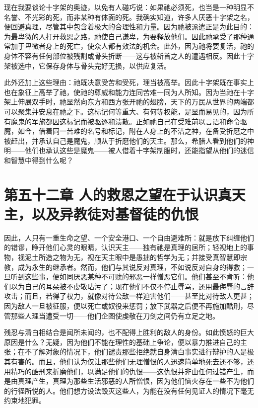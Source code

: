 现在我要谈论十字架的奥迹，以免有人碰巧说：如果祂必须死，也当是一种明显不名誉、不光彩的死，而非某种有体面的死。我确实知道，许多人厌恶十字架之名，便回避真理，尽管其中包含着极大的合理性和力量。因为祂被派遣正是为此目的：为最卑微的人打开救恩之路，祂使自己谦卑，为要释放他们。因此祂承受了那种通常加于卑微者身上的死亡，使众人都有效法的机会。此外，因为祂将要复活，祂的身体不容有任何部位被残割或骨头折断——这与被斩首之人的遭遇相反。因此十字架被选中，它保存身体与骨头完好无损，以供应复活。\par

此外还加上这些理由：祂既决意受苦和受死，理当被高举。因此十字架既在事实上也在象征上高举了祂，使祂的尊威和能力连同苦难一同为人所知。因为当祂在十字架上伸展双手时，祂显然向东方和西方张开祂的翅膀，天下的万民从世界的两端都可以聚集并安息在祂之下。这标记何等重大、有何等权能，是显而易见的，因为所有魔鬼的军旅都因这标记而被驱逐和溃散。正如祂自己在受难前以言语和命令驱魔，如今，借着同一苦难的名号和标记，附在人身上的不洁之神，在备受折磨之中被赶出，并承认自己是魔鬼，顺从于折磨他们的天主。那么，希腊人看到他们的神明——他们也承认这些是魔鬼——被人借着十字架制服时，还能指望从他们的迷信和智慧中得到什么呢？\par


\section{第五十二章 人的救恩之望在于认识真天主，以及异教徒对基督徒的仇恨}

因此，人只有一重生命之望、一个安全港口、一个自由避难所：就是放下纠缠他们的错谬，睁开他们心灵的眼睛，认识天主——独有祂是真理的居所；轻视地上的事物，视泥土所造之物为无，视在天主眼中是愚拙的哲学为无；并接受真智慧即宗教，成为永生的继承者。然而，他们与其说反对真理，不如说反对自身的得救；一旦听到这些事，便如同厌恶某种不可赎的邪恶一样憎恶它们。他们甚至不肯听：他们以为自己的耳朵被不虔敬玷污了；现在他们不仅不停止辱骂，还用最侮辱的言辞攻击；而且，若得了权力，就像对待公敌一样迫害他们——甚至比对待敌人更甚；因为敌人一旦被征服，便以死亡或奴役来惩罚；放下武器之后便不再施加酷刑，尽管那些人理当遭受一切——他们企图使虔敬在刀剑之间仍有立足之地。\par

残忍与清白相结合是闻所未闻的，也不配得上胜利的敌人的身份。如此愤怒的巨大原因是什么？无疑，因为他们不能在理性的基础上争论，便以暴力推进自己的主张；在不了解对象的情况下，他们谴责那些拒绝就自身清白事实进行辩护的人是极其有害的。而且，他们认为仅让那些他们无理憎恨的人迅速简单地死去还不够，还用精巧的酷刑来折磨他们，以满足他们的仇恨——这仇恨并非由任何过错产生，而是由真理产生，真理为那些生活邪恶的人所憎恨，因为他们恼火存在一些不为他们的行径所悦的人。他们想方设法毁灭这些人，为能在没有任何见证人的情况下毫无约束地犯罪。\par

